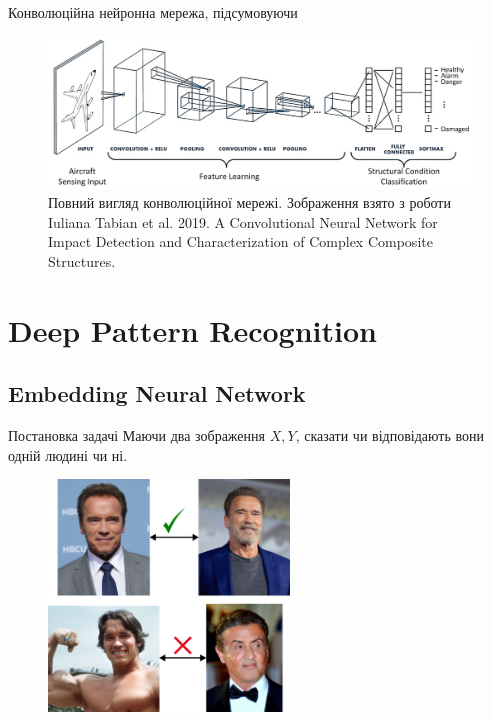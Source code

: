 \documentclass[xcolor={usenames,dvipsnames}]{beamer}
\begin{document}
    \begin{frame}{Конволюційна нейронна мережа, підсумовуючи}
        \begin{figure}
        \centering
            \includegraphics[width=\textwidth]{images/cnn_full.png}
            \caption{Повний вигляд конволюційної мережі. \scriptsize Зображення взято з роботи Iuliana Tabian et al. 2019. A Convolutional Neural Network for Impact Detection and Characterization of Complex Composite Structures.}
        \end{figure}
    \end{frame}

    \section{Deep Pattern Recognition}
    \subsection{Embedding Neural Network}
    \begin{frame}{Постановка задачі}
        Маючи два зображення $X,Y$, сказати чи відповідають вони одній людині чи ні.
        \begin{figure}
        \centering
            \includegraphics[width=0.57\textwidth]{images/face_comparison.png}
        \end{figure}
    \end{frame}
\end{document}
